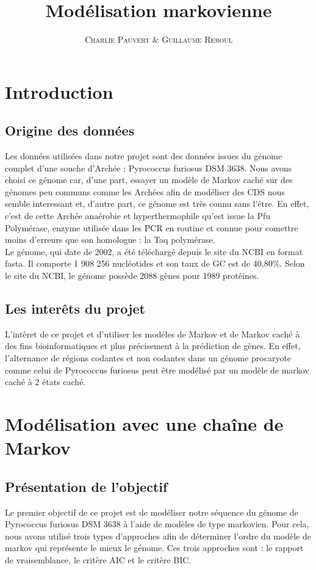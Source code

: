 \documentclass[12pt,a4paper]{article}
\title{Modélisation markovienne}
\author{\textsc{Charlie Pauvert} \& \textsc{Guillaume Reboul}}
\date{}
\begin{document}
\maketitle

\section{Introduction}
\subsection{Origine des données}
Les données utilisées dans notre projet sont des données issues du génome complet d'une souche d'Archée : Pyrococcus furiosus DSM 3638.
Nous avons choisi ce génome car, d'une part, essayer un modèle de Markov caché sur des génomes peu communs comme les Archées afin de modéliser des CDS nous semble interessant et, d'autre part, ce génome est très connu sans l'être. En effet, c'est de cette Archée anaérobie et hyperthermophile qu'est issue la Pfu Polymérase, enzyme utilisée dans les PCR en routine et connue pour comettre moins d'erreurs que son homologue : la Taq polymérase.
\\ \indent
Le génome, qui date de 2002, a été téléchargé depuis le site du NCBI en format fasta. Il comporte 1 908 256 nucléotides et son taux de GC est de 40,80\%. Selon le site du NCBI, le génome possède 2088 gènes pour 1989 protéines.
\subsection{Les interêts du projet}
L'intêret de ce projet et d'utiliser les modéles de Markov et de Markov caché à des fins bioinformatiques et plus précisement à la prédiction de gènes. En effet, l'alternance de régions codantes et non codantes dans un génome procaryote comme celui de Pyrococcus furiosus peut être modélisé par un modèle de markov caché à 2 états caché.

\section{Modélisation avec une chaîne de Markov}
\subsection{Présentation de l'objectif}
Le premier objectif de ce projet est de modéliser notre séquence du génome de Pyrococcus furiosus DSM 3638 à l'aide de modèles de type markovien.
Pour cela, nous avons utilisé trois types d'approches afin de déterminer l'ordre du modèle de markov qui représente le mieux le génome.
Ces trois approches sont : le rapport de vraisemblance, le critère AIC et le critère BIC.
\end{document}
